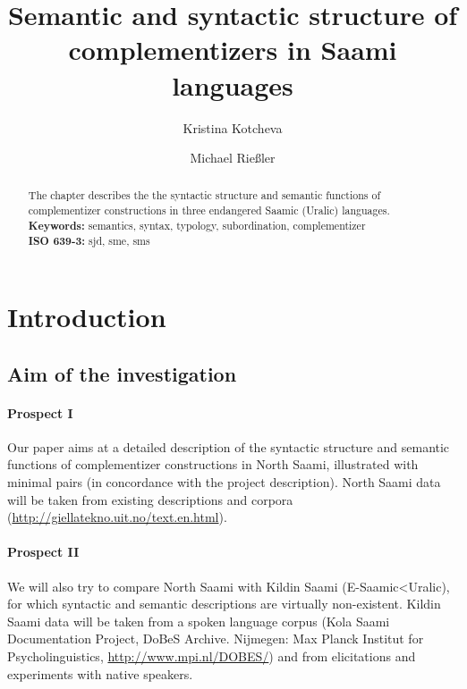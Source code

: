 \documentclass[a4,12pt]{scrartcl}
\title{Semantic and syntactic structure of complementizers in Saami languages}
\author[1]{Kristina Kotcheva}
\author[2]{Michael Rießler}
\affil[1]{Department of Linguistics, University of Konstanz}
\affil[2]{Scandinavian Department, University of Freiburg}
\begin{document}

\tableofcontents

\newpage
\maketitle

\begin{abstract}
The chapter describes the the syntactic structure and semantic functions of complementizer constructions in three endangered Saamic (Uralic) languages.\\


{\bf Keywords:} semantics, syntax, typology, subordination, complementizer\\

{\bf ISO 639-3:} sjd, sme, sms 
\end{abstract}

\section{Introduction}
\subsection{Aim of the investigation}
\paragraph{Prospect I}  Our paper aims at a detailed description of the syntactic structure and semantic functions of complementizer constructions in North Saami, illustrated with minimal pairs (in concordance with the project description). North Saami data will be taken from existing descriptions \citetext{e.g. \citealt{nickel1994, sammallahti1998b, nielsen1979-1}} and corpora (\url{http://giellatekno.uit.no/text.en.html}).  %

\paragraph{Prospect II} We will also try to compare North Saami with Kildin Saami (E-Saamic<Uralic), for which syntactic and semantic descriptions are virtually non-existent. Kildin Saami data will be taken from a spoken language corpus (Kola Saami Documentation Project, DoBeS Archive. Nijmegen: Max Planck 
Institut for Psycholinguistics, \url{http://www.mpi.nl/DOBES/}) and from elicitations and experiments with native speakers.
\end{document}
